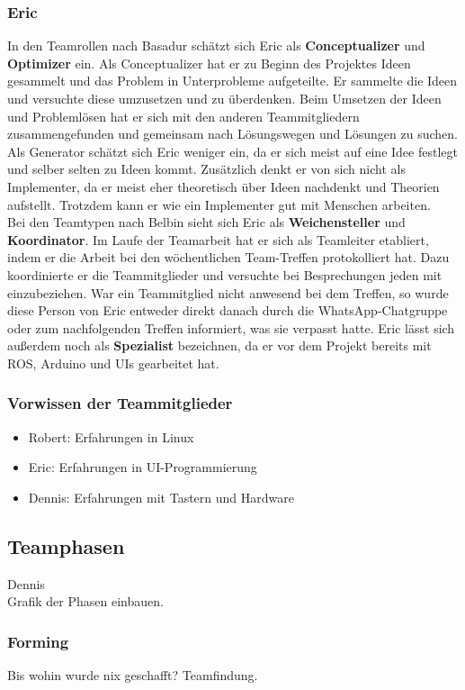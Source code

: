 \documentclass[a4paper,12pt,headsepline]{scrartcl}
\begin{document}
		\subsubsection{Eric}
		In den Teamrollen nach Basadur schätzt sich Eric als \textbf{Conceptualizer} und \textbf{Optimizer} ein. Als Conceptualizer hat er zu Beginn des Projektes Ideen gesammelt und das Problem in Unterprobleme aufgeteilte. Er sammelte die Ideen und versuchte diese umzusetzen und zu überdenken. Beim Umsetzen der Ideen und Problemlösen hat er sich mit den anderen Teammitgliedern zusammengefunden und gemeinsam nach Lösungswegen und Lösungen zu suchen. Als Generator schätzt sich Eric weniger ein, da er sich meist auf eine Idee festlegt und selber selten zu Ideen kommt. Zusätzlich denkt er von sich nicht als Implementer, da er meist eher theoretisch über Ideen nachdenkt und Theorien aufstellt. Trotzdem kann er wie ein Implementer gut mit Menschen arbeiten.\\
		Bei den Teamtypen nach Belbin sieht sich Eric als \textbf{Weichensteller} und \textbf{Koordinator}. Im Laufe der Teamarbeit hat er sich als Teamleiter etabliert, indem er die Arbeit bei den wöchentlichen Team-Treffen protokolliert hat. Dazu koordinierte er die Teammitglieder und versuchte bei Besprechungen jeden mit einzubeziehen. War ein Teammitglied nicht anwesend bei dem Treffen, so wurde diese Person von Eric entweder direkt danach durch die WhatsApp-Chatgruppe oder zum nachfolgenden Treffen informiert, was sie verpasst hatte. Eric lässt sich außerdem noch als \textbf{Spezialist} bezeichnen, da er vor dem Projekt bereits mit ROS, Arduino und UIs gearbeitet hat.\\
		
\subsubsection{Vorwissen der Teammitglieder}
			\begin{itemize}
				\item Robert: Erfahrungen in Linux
				\item Eric: Erfahrungen in UI-Programmierung
				\item Dennis: Erfahrungen mit Tastern und Hardware
			\end{itemize}
	\subsection{Teamphasen}
		Dennis\\
		Grafik der Phasen einbauen.
	\subsubsection{Forming}
		Bis wohin wurde nix geschafft? Teamfindung.
\end{document}
